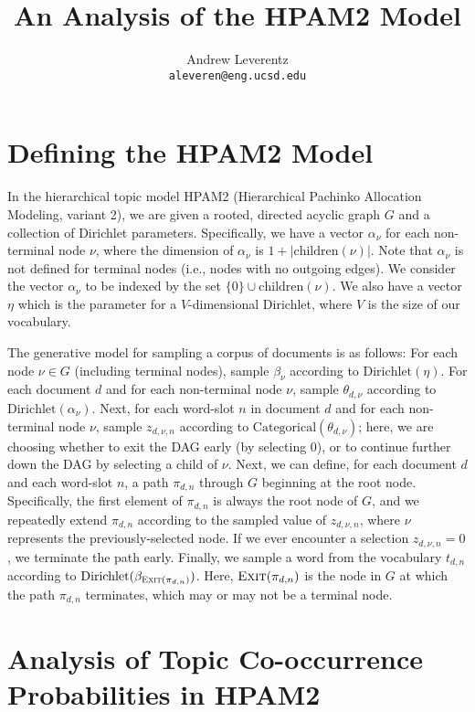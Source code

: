 \documentclass{article}
\title{An Analysis of the HPAM2 Model}
\author{
  Andrew Leverentz \\
  \texttt{aleveren@eng.ucsd.edu} \\
}
\date{}
\theoremstyle{definition}
\newcommand{\Exit}{\textsc{Exit}}
\begin{document}
\maketitle


\section{Defining the HPAM2 Model}

In the hierarchical topic model HPAM2 (Hierarchical Pachinko Allocation Modeling, variant 2), we are given a rooted, directed acyclic graph $G$ and a collection of Dirichlet parameters.
Specifically, we have a vector $\alpha_\nu$ for each non-terminal node $\nu$, where the dimension of $\alpha_\nu$ is $1 + |\text{children}(\nu)|$.
Note that $\alpha_\nu$ is not defined for terminal nodes (i.e., nodes with no outgoing edges).
We consider the vector $\alpha_\nu$ to be indexed by the set $\{0\} \cup \text{children}(\nu)$.
We also have a vector $\eta$ which is the parameter for a $V$-dimensional Dirichlet, where $V$ is the size of our vocabulary.

The generative model for sampling a corpus of documents is as follows:
For each node $\nu \in G$ (including terminal nodes), sample $\beta_\nu$ according to $\text{Dirichlet}(\eta)$.
For each document $d$ and for each non-terminal node $\nu$, sample $\theta_{d,\nu}$ according to $\text{Dirichlet}(\alpha_\nu)$.
Next, for each word-slot $n$ in document $d$ and for each non-terminal node $\nu$, sample $z_{d,\nu,n}$ according to $\text{Categorical}(\theta_{d,\nu})$; here, we are choosing whether to exit the DAG early (by selecting $0$), or to continue further down the DAG by selecting a child of $\nu$.
Next, we can define, for each document $d$ and each word-slot $n$, a path $\pi_{d,n}$ through $G$ beginning at the root node.
Specifically, the first element of $\pi_{d,n}$ is always the root node of $G$, and we repeatedly extend $\pi_{d,n}$ according to the sampled value of $z_{d,\nu,n}$, where $\nu$ represents the previously-selected node.
If we ever encounter a selection $z_{d,\nu,n} = 0$, we terminate the path early.
Finally, we sample a word from the vocabulary $t_{d,n}$ according to $\text{Dirichlet}(\beta_{\Exit(\pi_{d,n})})$.
Here, $\Exit(\pi_{d,n})$ is the node in $G$ at which the path $\pi_{d,n}$ terminates, which may or may not be a terminal node.

\section{Analysis of Topic Co-occurrence Probabilities in HPAM2}
\end{document}
